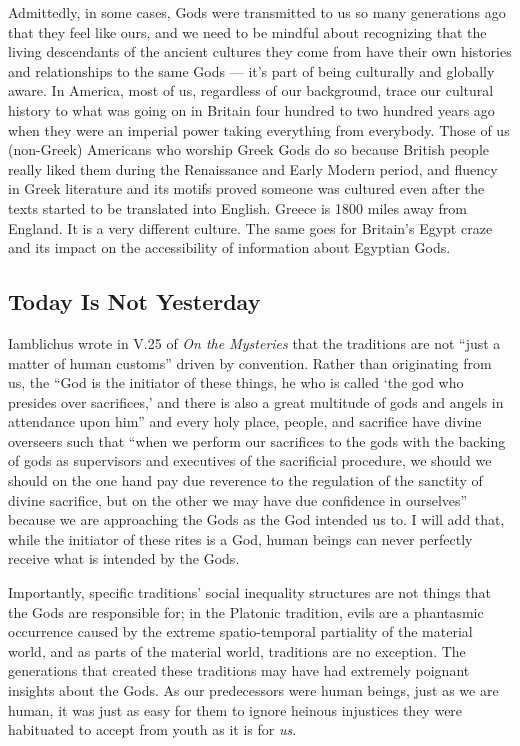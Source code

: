 \documentclass[
]{book}
\begin{document}
Admittedly, in some cases, Gods were transmitted to us so many generations ago that they feel like ours, and we need to be mindful about recognizing that the living descendants of the ancient cultures they come from have their own histories and relationships to the same Gods --- it's part of being culturally and globally aware. In America, most of us, regardless of our background, trace our cultural history to what was going on in Britain four hundred to two hundred years ago when they were an imperial power taking everything from everybody. Those of us (non-Greek) Americans who worship Greek Gods do so because British people really liked them during the Renaissance and Early Modern period, and fluency in Greek literature and its motifs proved someone was cultured even after the texts started to be translated into English. Greece is 1800 miles away from England. It is a very different culture. The same goes for Britain's Egypt craze and its impact on the accessibility of information about Egyptian Gods.

\hypertarget{today-is-not-yesterday}{%
\subsection{Today Is Not Yesterday}\label{today-is-not-yesterday}}

Iamblichus wrote in V.25 of \emph{On the Mysteries} that the traditions are not ``just a matter of human customs'' driven by convention. Rather than originating from us, the ``God is the initiator of these things, he who is called `the god who presides over sacrifices,' and there is also a great multitude of gods and angels in attendance upon him'' and every holy place, people, and sacrifice have divine overseers such that ``when we perform our sacrifices to the gods with the backing of gods as supervisors and executives of the sacrificial procedure, we should we should on the one hand pay due reverence to the regulation of the sanctity of divine sacrifice, but on the other we may have due confidence in ourselves'' because we are approaching the Gods as the God intended us to. I will add that, while the initiator of these rites is a God, human beings can never perfectly receive what is intended by the Gods.

Importantly, specific traditions' social inequality structures are not things that the Gods are responsible for; in the Platonic tradition, evils are a phantasmic occurrence caused by the extreme spatio-temporal partiality of the material world, and as parts of the material world, traditions are no exception. The generations that created these traditions may have had extremely poignant insights about the Gods. As our predecessors were human beings, just as we are human, it was just as easy for them to ignore heinous injustices they were habituated to accept from youth as it is for \emph{us}.
\end{document}
